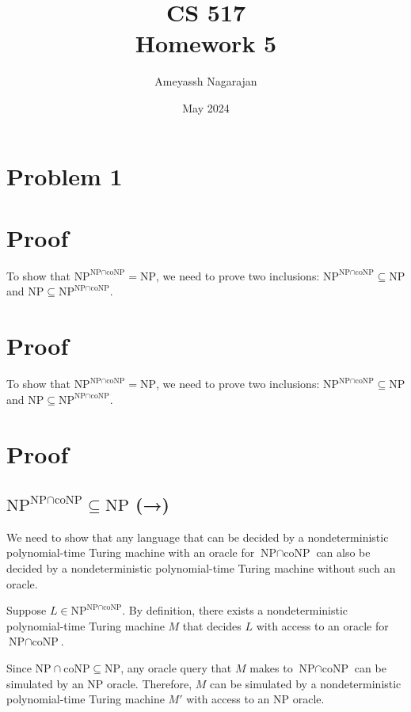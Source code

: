 \documentclass{article}
\title{CS 517 \\ Homework 5}
\author{Ameyassh Nagarajan}
\date{May 2024}
\begin{document}
\maketitle
\section{Problem 1}
\section*{Proof}

To show that \(\text{NP}^{\text{NP} \cap \text{coNP}} = \text{NP}\), we need to prove two inclusions: \(\text{NP}^{\text{NP} \cap \text{coNP}} \subseteq \text{NP}\) and \(\text{NP} \subseteq \text{NP}^{\text{NP} \cap \text{coNP}}\).

\section*{Proof}

To show that \(\text{NP}^{\text{NP} \cap \text{coNP}} = \text{NP}\), we need to prove two inclusions: \(\text{NP}^{\text{NP} \cap \text{coNP}} \subseteq \text{NP}\) and \(\text{NP} \subseteq \text{NP}^{\text{NP} \cap \text{coNP}}\).

\section*{Proof}

\subsection*{\(\text{NP}^{\text{NP} \cap \text{coNP}} \subseteq \text{NP}\) (→)}

We need to show that any language that can be decided by a nondeterministic polynomial-time Turing machine with an oracle for \(\text{NP} \cap \text{coNP}\) can also be decided by a nondeterministic polynomial-time Turing machine without such an oracle.

Suppose \(L \in \text{NP}^{\text{NP} \cap \text{coNP}}\). By definition, there exists a nondeterministic polynomial-time Turing machine \(M\) that decides \(L\) with access to an oracle for \(\text{NP} \cap \text{coNP}\).

Since \(\text{NP} \cap \text{coNP} \subseteq \text{NP}\), any oracle query that \(M\) makes to \(\text{NP} \cap \text{coNP}\) can be simulated by an NP oracle. Therefore, \(M\) can be simulated by a nondeterministic polynomial-time Turing machine \(M'\) with access to an NP oracle.
\end{document}
